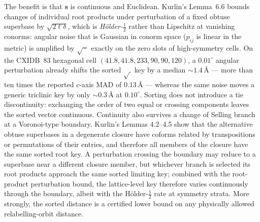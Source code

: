 \documentclass[11pt]{article}
\newcommand{\Ang}{\text{\AA}}
\newcommand{\sortkey}{\mathbf{s}}
\begin{document}
The benefit is that $\sortkey$ is continuous and Euclidean. Kurlin's Lemma~6.6 bounds changes of individual root products under perturbation of a fixed obtuse superbase by $\sqrt{2\ell\delta}$, which is \emph{H\"older-$\tfrac12$} rather than Lipschitz at vanishing conorms: angular noise that is Gaussian in conorm space ($p_{ij}$ is linear in the metric) is amplified by $\sqrt{\,\cdot\,}$ exactly on the zero slots of high-symmetry cells. On the CXIDB~83 hexagonal cell $(41.8,41.8,233,90,90,120)$, a $0.01^\circ$ angular perturbation already shifts the sorted $\sqrt{\,}$ key by a median $\sim1.4\,\Ang$ --- more than ten times the reported $c$-axis MAD of $0.13\,\Ang$ --- whereas the same noise moves a generic triclinic key by only $\sim0.3\,\Ang$ at $0.10^\circ$. Sorting does not introduce a tie discontinuity: exchanging the order of two equal or crossing components leaves the sorted vector continuous. Continuity also survives a change of Selling branch at a Voronoi-type boundary. Kurlin's Lemmas 4.2--4.5 show that the alternative obtuse superbases in a degenerate closure have coforms related by transpositions or permutations of their entries, and therefore all members of the closure have the same sorted root key. A perturbation crossing the boundary may reduce to a superbase near a different closure member, but whichever branch is selected its root products approach the same sorted limiting key; combined with the root-product perturbation bound, the lattice-level key therefore varies continuously through the boundary, albeit with the H\"older-$\tfrac12$ rate at symmetry strata. More strongly, the sorted distance is a certified lower bound on any physically allowed relabelling-orbit distance.
\end{document}

